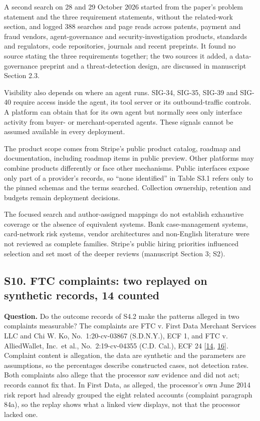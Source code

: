 \documentclass[
  11pt,
]{article}
\begin{document}
A second search on 28 and 29 October 2026 started from the paper's
problem statement and the three requirement statements, without the
related-work section, and logged 388 searches and page reads across
patents, payment and fraud vendors, agent-governance and
security-investigation products, standards and regulators, code
repositories, journals and recent preprints. It found no source stating
the three requirements together; the two sources it added, a
data-governance preprint and a threat-detection design, are discussed in
manuscript Section 2.3.

Visibility also depends on where an agent runs. \mbox{SIG-34},
\mbox{SIG-35}, \mbox{SIG-39} and \mbox{SIG-40} require access inside the
agent, its tool server or its outbound-traffic controls. A platform can
obtain that for its own agent but normally sees only interface activity
from buyer- or merchant-operated agents. These signals cannot be assumed
available in every deployment.

The product scope comes from Stripe's public product catalog, roadmap
and documentation, including roadmap items in public preview. Other
platforms may combine products differently or face other mechanisms.
Public interfaces expose only part of a provider's records, so ``none
identified'' in Table S3.1 refers only to the pinned schemas and the
terms searched. Collection ownership, retention and budgets remain
deployment decisions.

The focused search and author-assigned mappings do not establish
exhaustive coverage or the absence of equivalent systems. Bank
case-management systems, card-network risk systems, vendor architectures
and non-English literature were not reviewed as complete families.
Stripe's public hiring priorities influenced selection and set most of
the deeper reviews (manuscript Section 3; S2).

\FloatBarrier

\hypertarget{s10.-ftc-complaints-two-replayed-on-synthetic-records-14-counted}{%
\subsection{S10. FTC complaints: two replayed on synthetic records, 14
counted}\label{s10.-ftc-complaints-two-replayed-on-synthetic-records-14-counted}}

\suppressfloats[t]

\textbf{Question.} Do the outcome records of S4.2 make the patterns
alleged in two complaints measurable? The complaints are FTC v. First
Data Merchant Services LLC and Chi W. Ko, No.~1:20-cv-03867 (S.D.N.Y.),
ECF 1, and FTC v. AlliedWallet, Inc.~et al., No.~2:19-cv-04355 (C.D.
Cal.), ECF 24 {[}\protect\hyperlink{ref-FTC2020FirstData}{14},
\protect\hyperlink{ref-FTC2019Allied}{16}{]}. Complaint content is
allegation, the data are synthetic and the parameters are assumptions,
so the percentages describe constructed cases, not detection rates. Both
complaints also allege that the processor saw evidence and did not act;
records cannot fix that. In First Data, as alleged, the processor's own
June 2014 risk report had already grouped the eight related accounts
(complaint paragraph 84a), so the replay shows what a linked view
displays, not that the processor lacked one.
\end{document}
